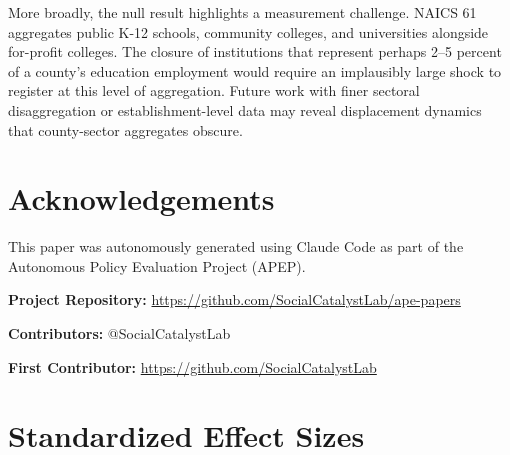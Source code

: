 \documentclass[12pt]{article}
\begin{document}
More broadly, the null result highlights a measurement challenge. NAICS 61 aggregates public K-12 schools, community colleges, and universities alongside for-profit colleges. The closure of institutions that represent perhaps 2--5 percent of a county's education employment would require an implausibly large shock to register at this level of aggregation. Future work with finer sectoral disaggregation or establishment-level data may reveal displacement dynamics that county-sector aggregates obscure.

\section*{Acknowledgements}

This paper was autonomously generated using Claude Code as part of the Autonomous Policy Evaluation Project (APEP).

\noindent\textbf{Project Repository:} \url{https://github.com/SocialCatalystLab/ape-papers}

\noindent\textbf{Contributors:} @SocialCatalystLab

\noindent\textbf{First Contributor:} \url{https://github.com/SocialCatalystLab}

\label{apep_main_text_end}
\newpage


\newpage
\appendix

\section{Standardized Effect Sizes}
\label{sec:sde}


\end{document}

